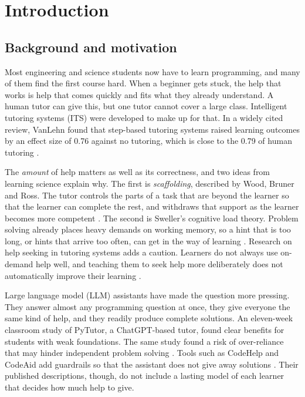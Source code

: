 \chapter{Introduction}
\section{Background and motivation}
Most engineering and science students now have to learn programming, and many of them find the first course hard. When a beginner gets stuck, the help that works is help that comes quickly and fits what they already understand. A human tutor can give this, but one tutor cannot cover a large class. Intelligent tutoring systems (ITS) were developed to make up for that. In a widely cited review, VanLehn found that step-based tutoring systems raised learning outcomes by an effect size of 0.76 against no tutoring, which is close to the 0.79 of human tutoring \cite{vanlehn2011}.

The \emph{amount} of help matters as well as its correctness, and two ideas from learning science explain why. The first is \emph{scaffolding}, described by Wood, Bruner and Ross. The tutor controls the parts of a task that are beyond the learner so that the learner can complete the rest, and withdraws that support as the learner becomes more competent \cite{wood1976}. The second is Sweller's cognitive load theory. Problem solving already places heavy demands on working memory, so a hint that is too long, or hints that arrive too often, can get in the way of learning \cite{sweller1988}. Research on help seeking in tutoring systems adds a caution. Learners do not always use on-demand help well, and teaching them to seek help more deliberately does not automatically improve their learning \cite{aleven2016}.

Large language model (LLM) assistants have made the question more pressing. They answer almost any programming question at once, they give everyone the same kind of help, and they readily produce complete solutions. An eleven-week classroom study of PyTutor, a ChatGPT-based tutor, found clear benefits for students with weak foundations. The same study found a risk of over-reliance that may hinder independent problem solving \cite{yang2024}. Tools such as CodeHelp and CodeAid add guardrails so that the assistant does not give away solutions \cite{liffiton2023,kazemitabaar2024}. Their published descriptions, though, do not include a lasting model of each learner that decides how much help to give.

